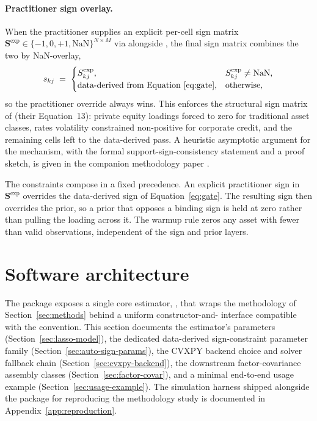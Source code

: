 \documentclass[article]{jss}
\begin{document}
\paragraph{Practitioner sign overlay.}
When the practitioner supplies an explicit per-cell sign matrix
$\bm{S}^{\mathrm{exp}} \in \{-1, 0, +1, \mathrm{NaN}\}^{N \times M}$ via
 alongside
, the final sign matrix combines the
two by NaN-overlay,
%
\begin{equation} \label{eq:overlay}
s_{kj} \;=\;
\begin{cases}
	S^{\mathrm{exp}}_{kj}, & S^{\mathrm{exp}}_{kj} \neq \mathrm{NaN}, \\
	\text{data-derived from Equation~\ref{eq:gate}},
	& \text{otherwise,}
\end{cases}
\end{equation}
%
so the practitioner override always wins. This enforces the structural
sign matrix of \cite{Sepp+Hansen+Kastenholz:2026MATF} (their
Equation~13): private equity loadings forced to zero for traditional
asset classes, rates volatility constrained non-positive for corporate
credit, and the remaining cells left to the data-derived pass. A
heuristic asymptotic argument for the mechanism, with the formal
support-sign-consistency statement and a proof sketch, is given in the
companion methodology paper \citep{Sepp+Kastenholz:2026sign}.

The constraints compose in a fixed precedence. An explicit practitioner sign in
$\bm{S}^{\mathrm{exp}}$ overrides the data-derived sign of
Equation~\ref{eq:gate}. The resulting sign then overrides the prior, so a prior
that opposes a binding sign is held at zero rather than pulling the loading
across it. The warmup rule zeros any asset with fewer than 
valid observations, independent of the sign and prior layers.



\section[Software architecture]{Software architecture} \label{sec:software}

The  package exposes a single core estimator,
, that wraps the methodology of Section~\ref{sec:methods}
behind a uniform constructor-and- interface compatible with
the  \citep{Pedregosa+etal:2011} convention. This
section documents the estimator's parameters
(Section~\ref{sec:lasso-model}), the dedicated data-derived
sign-constraint parameter family
(Section~\ref{sec:auto-sign-params}), the CVXPY backend choice and
solver fallback chain (Section~\ref{sec:cvxpy-backend}), the
downstream factor-covariance assembly classes
(Section~\ref{sec:factor-covar}), and a minimal end-to-end usage example
(Section~\ref{sec:usage-example}). The simulation harness shipped
alongside the package for reproducing the methodology study is
documented in Appendix~\ref{app:reproduction}.
\end{document}
